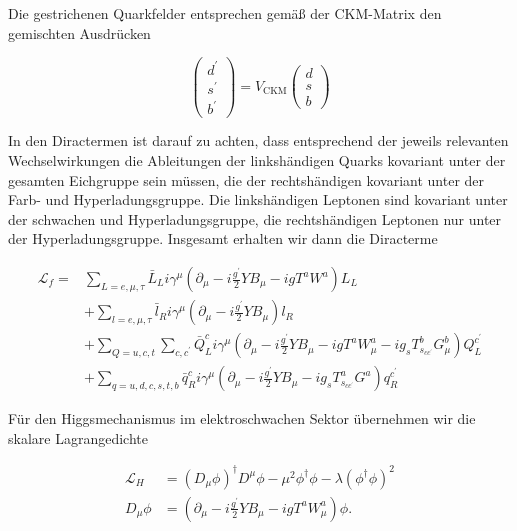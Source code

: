\documentclass[10pt, letterpaper]{article}
\begin{document}
Die gestrichenen Quarkfelder entsprechen gemäß der CKM-Matrix den gemischten Ausdrücken

$$
\left(\begin{array}{c}
d^{\prime} \\
s^{\prime} \\
b^{\prime}
\end{array}\right)=V_{\text {CKM}}\left(\begin{array}{l}
d \\
s \\
b
\end{array}\right)
$$


In den Diractermen ist darauf zu achten, dass entsprechend der jeweils relevanten Wechselwirkungen die Ableitungen der linkshändigen Quarks kovariant unter der gesamten Eichgruppe sein müssen, die der rechtshändigen kovariant unter der Farb- und Hyperladungsgruppe. Die linkshändigen Leptonen sind kovariant unter\\
der schwachen und Hyperladungsgruppe, die rechtshändigen Leptonen nur unter der Hyperladungsgruppe. Insgesamt erhalten wir dann die Diracterme

$$
\begin{aligned}
\mathscr{L}_{f}= & \sum_{L=e, \mu, \tau} \bar{L}_{L} i \gamma^{\mu}\left(\partial_{\mu}-i \frac{g^{\prime}}{2} Y B_{\mu}-i g T^{a} W^{a}\right) L_{L} \\
& +\sum_{l=e, \mu, \tau} \bar{l}_{R} i \gamma^{\mu}\left(\partial_{\mu}-i \frac{g^{\prime}}{2} Y B_{\mu}\right) l_{R} \\
& +\sum_{Q=u, c, t} \sum_{c, c^{\prime}} \bar{Q}_{L}^{c} i \gamma^{\mu}\left(\partial_{\mu}-i \frac{g^{\prime}}{2} Y B_{\mu}-i g T^{a} W_{\mu}^{a}-i g_{s} T_{s_{c c^{\prime}}}^{b} G_{\mu}^{b}\right) Q_{L}^{c^{\prime}} \\
& +\sum_{q=u, d, c, s, t, b} \bar{q}_{R}^{c} i \gamma^{\mu}\left(\partial_{\mu}-i \frac{g^{\prime}}{2} Y B_{\mu}-i g_{s} T_{s_{c c^{\prime}}}^{a} G^{a}\right) q_{R}^{c^{\prime}}
\end{aligned}
$$

Für den Higgsmechanismus im elektroschwachen Sektor übernehmen wir die skalare Lagrangedichte

$$
\begin{aligned}
\mathscr{L}_{H} & =\left(D_{\mu} \phi\right)^{\dagger} D^{\mu} \phi-\mu^{2} \phi^{\dagger} \phi-\lambda\left(\phi^{\dagger} \phi\right)^{2} \\
D_{\mu} \phi & =\left(\partial_{\mu}-i \frac{g^{\prime}}{2} Y B_{\mu}-i g T^{a} W_{\mu}^{a}\right) \phi .
\end{aligned}
$$
\end{document}
